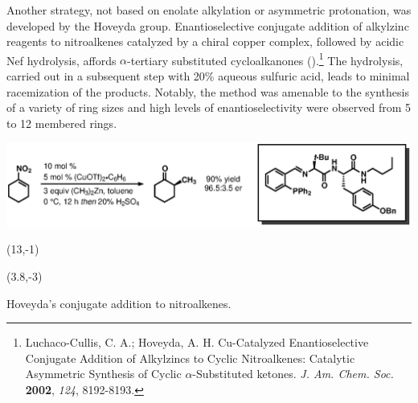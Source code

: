  
 Another strategy, not based on enolate alkylation or asymmetric protonation, was developed by the
 Hoveyda group. Enantioselective conjugate addition of alkylzinc reagents to nitroalkenes catalyzed
 by a chiral copper complex, followed by acidic Nef hydrolysis, affords $\alpha$-tertiary
 substituted cycloalkanones ().\footnote{{\frenchspacing Luchaco-Cullis, C.
 A.; Hoveyda, A.
 H.
 Cu-Catalyzed Enantioselective Conjugate Addition of Alkylzincs to Cyclic Nitroalkenes: Catalytic
 Asymmetric Synthesis of Cyclic $\alpha$-Substituted ketones. \textit{J. Am. Chem. Soc.}
 \textbf{2002}, \textit{124}, 8192-8193.}} The hydrolysis, carried out in a subsequent step with
 20\% aqueous sulfuric acid, leads to minimal racemization of the products. Notably, the method
 was amenable to the synthesis of a variety of ring sizes and high levels of enantioselectivity
 were observed from 5 to 12 membered rings.
 
 
 \begin{Scheme}[h]
  \centering \includegraphics[scale=0.8]{chp_asymmetric/images/hoveydaconj}
  \begin{textblock}{1}(13,-1)  \end{textblock}
  \begin{textblock}{1}(3.8,-3)  \end{textblock}
  \caption{Hoveyda's conjugate addition to nitroalkenes.}
  \label{sch:ashoveydaconj}
\end{Scheme}   
 
